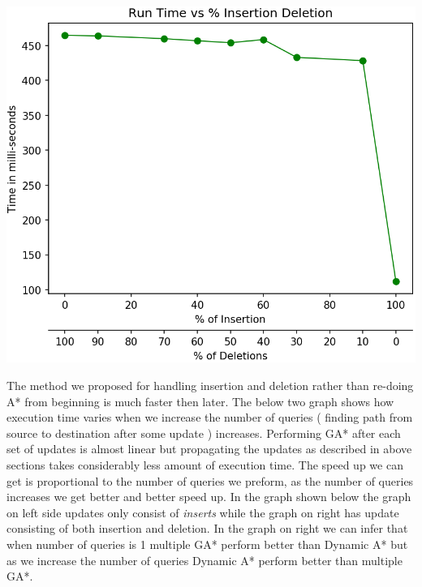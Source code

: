 \documentclass[a4paper]{article}
\begin{document}
\begin{center}
\includegraphics[scale=0.45]{img/IDvK.png}        
\end{center}
The method we proposed for handling insertion and deletion rather than re-doing A* from beginning is much faster then later. The below two graph shows how execution time varies when we increase the number of queries ( finding path from source to destination after some update ) increases. Performing  GA* after each set of updates is almost linear but propagating the updates as described in above sections takes considerably less amount of execution time. The speed up we can get is proportional to the number of queries we preform, as the number of queries increases we get better and better speed up. In the graph shown below the graph on left side updates only consist of \textit{inserts} while the graph on right has update consisting of both insertion and deletion. In the graph on right we can infer that when number of queries is 1 multiple GA* perform better than Dynamic A* but as we increase the number of queries Dynamic A* perform better than multiple GA*.
\end{document}
